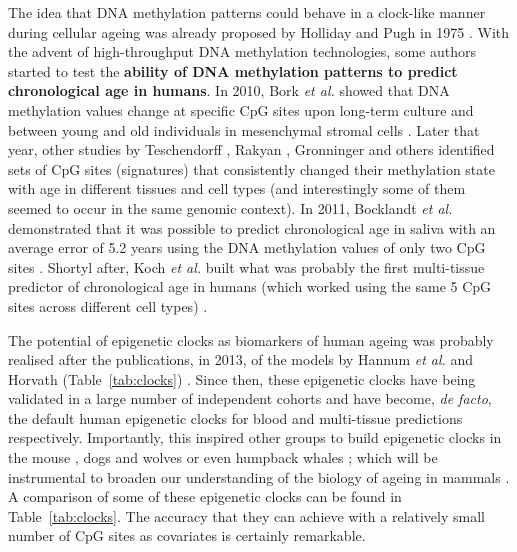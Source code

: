 \bigskip

The idea that DNA methylation patterns could behave in a clock-like manner during cellular ageing was already proposed by Holliday and Pugh in 1975 \cite{Holliday1975}. With the advent of high-throughput DNA methylation technologies, some authors started to test the \textbf{ability of DNA methylation patterns to predict chronological age in humans}. In 2010, Bork \textit{et al.} showed that DNA methylation values change at specific CpG sites upon long-term culture and between young and old individuals in mesenchymal stromal cells \cite{Bork2010}. Later that year, other studies by Teschendorff \cite{Teschendorff2010}, Rakyan \cite{Rakyan2010}, Gronninger \cite{Gronniger2010} and others identified sets of CpG sites (signatures) that consistently changed their methylation state with age in different tissues and cell types (and interestingly some of them seemed to occur in the same genomic context). In 2011, Bocklandt \textit{et al.} demonstrated that it was possible to predict chronological age in saliva with an average error of 5.2 years using the DNA methylation values of only two CpG sites \cite{Bocklandt2011}. Shortyl after, Koch \textit{et al.} built what was probably the first multi-tissue predictor of chronological age in humans (which worked using the same 5 CpG sites across different cell types) \cite{Koch2011}. 

\bigskip

The potential of epigenetic clocks as biomarkers of human ageing was probably realised after the publications, in 2013, of the models by Hannum \textit{et al.} \cite{Hannum2013} and Horvath (Table~\ref{tab:clocks}) \cite{Horvath2013}. Since then, these epigenetic clocks have being validated in a large number of independent cohorts and have become, \textit{de facto}, the default human epigenetic clocks for blood and multi-tissue predictions respectively. Importantly, this inspired other groups to build epigenetic clocks in the mouse \cite{Wang2017,Stubbs2017,Petkovich2017,Thompson2018,Meer2018}, dogs and wolves \cite{Thompson2017} or even humpback whales \cite{Polanowski2014}; which will be instrumental to broaden our understanding of the biology of ageing in mammals \cite{Stubbs2017}. A comparison of some of these epigenetic clocks can be found in Table~\ref{tab:clocks}. The accuracy that they can achieve with a relatively small number of CpG sites as covariates is certainly remarkable.

\bigskip

